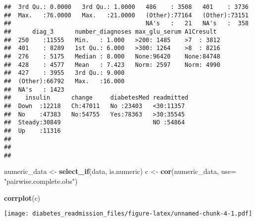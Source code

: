 \documentclass[]{article}
\newenvironment{Shaded}{\begin{snugshade}}{\end{snugshade}}
\newcommand{\KeywordTok}[1]{\textcolor[rgb]{0.13,0.29,0.53}{\textbf{#1}}}
\newcommand{\DataTypeTok}[1]{\textcolor[rgb]{0.13,0.29,0.53}{#1}}
\newcommand{\StringTok}[1]{\textcolor[rgb]{0.31,0.60,0.02}{#1}}
\newcommand{\CommentTok}[1]{\textcolor[rgb]{0.56,0.35,0.01}{\textit{#1}}}
\newcommand{\OperatorTok}[1]{\textcolor[rgb]{0.81,0.36,0.00}{\textbf{#1}}}
\newcommand{\NormalTok}[1]{#1}
\begin{document}
\begin{verbatim}
##  3rd Qu.: 0.0000   3rd Qu.: 1.0000   486    : 3508   401    : 3736  
##  Max.   :76.0000   Max.   :21.0000   (Other):77164   (Other):73151  
##                                      NA's   :   21   NA's   :  358  
##      diag_3      number_diagnoses max_glu_serum A1Cresult   
##  250    :11555   Min.   : 1.000   >200: 1485    >7  : 3812  
##  401    : 8289   1st Qu.: 6.000   >300: 1264    >8  : 8216  
##  276    : 5175   Median : 8.000   None:96420    None:84748  
##  428    : 4577   Mean   : 7.423   Norm: 2597    Norm: 4990  
##  427    : 3955   3rd Qu.: 9.000                             
##  (Other):66792   Max.   :16.000                             
##  NA's   : 1423                                              
##    insulin      change     diabetesMed readmitted 
##  Down  :12218   Ch:47011   No :23403   <30:11357  
##  No    :47383   No:54755   Yes:78363   >30:35545  
##  Steady:30849                          NO :54864  
##  Up    :11316                                     
##                                                   
##                                                   
## 
\end{verbatim}

\begin{Shaded}
\begin{Highlighting}[]
\NormalTok{numeric_data <-}\StringTok{ }\KeywordTok{select_if}\NormalTok{(data, is.numeric)}
\NormalTok{c <-}\StringTok{ }\KeywordTok{cor}\NormalTok{(numeric_data, }\DataTypeTok{use=} \StringTok{"pairwise.complete.obs"}\NormalTok{)}

\KeywordTok{corrplot}\NormalTok{(c)}
\end{Highlighting}
\end{Shaded}

\texttt{[image: diabetes\_readmission\_files/figure-latex/unnamed-chunk-4-1.pdf]}

\begin{Shaded}
\end{Shaded}

\begin{Shaded}
\end{Shaded}
\end{document}
